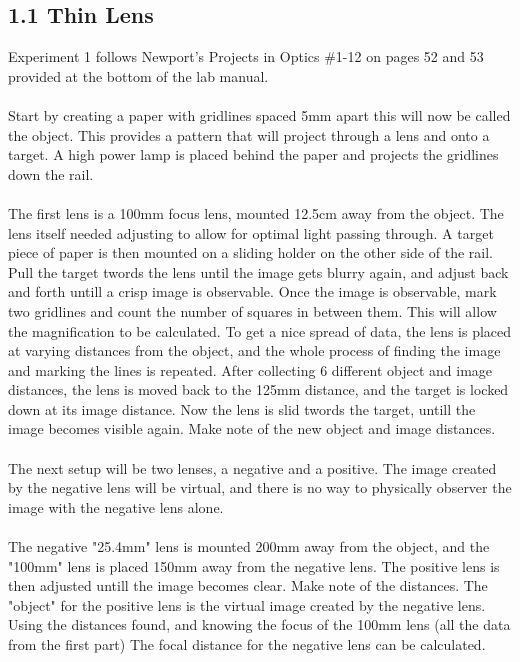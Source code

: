 \documentclass[a4paper,12pt]{article}
\begin{document}
\subsection*{1.1 Thin Lens}
Experiment 1 follows Newport's Projects in Optics \#1-12 on pages 52 and 53 provided at the bottom of the lab manual. \\
\\
Start by creating a paper with gridlines spaced 5mm apart this will now be called the object.  This provides a pattern that will project through a lens and onto a target.  A high power lamp is placed behind the paper and projects the gridlines down the rail.\\
\\
The first lens is a 100mm focus lens, mounted 12.5cm away from the object.  The lens itself needed adjusting to allow for optimal light passing through.  A target piece of paper is then mounted on a sliding holder on the other side of the rail.  Pull the target twords the lens until the image gets blurry again, and adjust back and forth untill a crisp image is observable.  Once the image is observable, mark two gridlines and count the number of squares in between them.  This will allow the magnification to be calculated.  To get a nice spread of data, the lens is placed at varying distances from the object, and the whole process of finding the image and marking the lines is repeated.  After collecting 6 different object and image distances, the lens is moved back to the 125mm distance, and the target is locked down at its image distance.  Now the lens is slid twords the target, untill the image becomes visible again.  Make note of the new object and image distances.\\
\\
The next setup will be two lenses, a negative and a positive.  The image created by the negative lens will be virtual, and there is no way to physically observer the image with the negative lens alone.\\
\\
The negative "25.4mm" lens is mounted 200mm away from the object, and the "100mm" lens is placed 150mm away from the negative lens.  The positive lens is then adjusted untill the image becomes clear.  Make note of the distances.  The "object" for the positive lens is the virtual image created by the negative lens.  Using the distances found, and knowing the focus of the 100mm lens (all the data from the first part)  The focal distance for the negative lens can be calculated.
\end{document}

